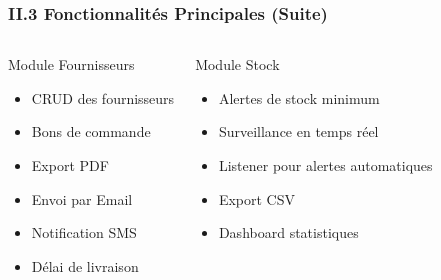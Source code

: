 \documentclass[11pt, aspectratio=169]{beamer}
\begin{document}
\begin{frame}
    \frametitle{II.3 Fonctionnalités Principales (Suite)}
    
    \begin{columns}[T]
        \begin{block}{Module Fournisseurs}
            \begin{itemize}
                \item[\faTruck] CRUD des fournisseurs
                \item[\faFileContract] Bons de commande
                \item[\faPDF] Export PDF
                \item[\faEnvelope] Envoi par Email
                \item[\faSms] Notification SMS
                \item[\faCalendarDays] Délai de livraison
            \end{itemize}
        \end{block}
        
        \begin{block}{Module Stock}
            \begin{itemize}
                \item[\faBell] Alertes de stock minimum
                \item[\faEye] Surveillance en temps réel
                \item[\faShieldAlt] Listener pour alertes automatiques
                \item[\faFileExcel] Export CSV
                \item[\faChartBar] Dashboard statistiques
            \end{itemize}
        \end{block}
    \end{columns}
\end{frame}
\end{document}
